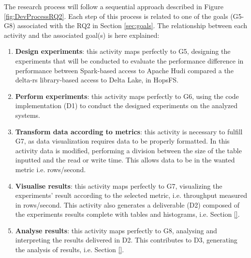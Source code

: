The research process will follow a sequential approach described in Figure \ref{fig:DevProcessRQ2}. Each step of this process is related to one of the goals (G5-G8) associated with the RQ2 in Section \ref{sec:goals}.
The relationship between each activity and the associated goal(s) is here explained:
\begin{enumerate}
    \item \textbf{Design experiments}: this activity maps perfectly to G5, designing the experiments that will be conducted to evaluate the performance difference in performance between Spark-based access to Apache Hudi compared a the delta-rs \cite{DeltaioDeltars2024} library-based access to Delta Lake, in \gls{HopsFS}. 
    \item \textbf{Perform experiments}: this activity maps perfectly to G6, using the code implementation (D1) to conduct the designed experiments on the analyzed systems.
    \item \textbf{Transform data according to metrics}: this activity is necessary to fulfill G7, as data visualization requires data to be properly formatted. In this activity data is modified, performing a division between the size of the table inputted and the read or write time. This allows data to be in the wanted metric i.e. rows/second.
    \item \textbf{Visualise results}: this activity maps perfectly to G7, visualizing the experiments' result according to the selected metric, i.e. throughput measured in rows/second. This activity also generates a deliverable (D2) composed of the experiments results complete with tables and histograms, i.e. Section \ref{}.
    \item \textbf{Analyse results}: this activity maps perfectly to G8, analysing and interpreting the results delivered in D2. This contributes to D3, generating the analysis of results, i.e. Section \ref{}.
\end{enumerate}
